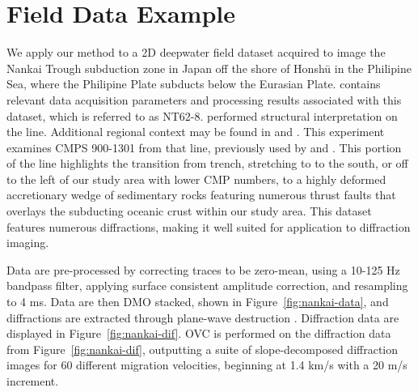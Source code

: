 
\section{Field Data Example}

We apply our method to a 2D deepwater field dataset acquired to image the Nankai Trough subduction zone in Japan off the shore of Honsh\=u in the Philipine Sea, where the Philipine Plate subducts below the Eurasian Plate.  \cite{moore1990structure} contains relevant data acquisition parameters and processing results associated with this dataset, which is referred to as NT62-8.  \cite{moore1993character} performed structural interpretation on the line. Additional regional context may be found in \cite{moore-2007} and \cite{bangs-2009}.  This experiment examines CMPS 900-1301 from that line, previously used by \cite{forel2005seismic} and \cite{deckerovc}. This portion of the line highlights the transition from trench, stretching to to the south, or off to the left of our study area with lower CMP numbers, to a highly deformed accretionary wedge of sedimentary rocks featuring numerous thrust faults that overlays the subducting oceanic crust within our study area.  This dataset features numerous diffractions, making it well suited for application to diffraction imaging.




Data are pre-processed by correcting traces to be zero-mean, using a 10-125 Hz bandpass filter, applying surface consistent amplitude correction, and resampling to 4 ms. Data are then DMO stacked, shown in Figure~\ref{fig:nankai-data}, and diffractions are extracted through plane-wave destruction \cite[]{fomel2}.  Diffraction data are displayed in Figure~\ref{fig:nankai-dif}.  
OVC is performed on the diffraction data from Figure~\ref{fig:nankai-dif}, outputting a suite of slope-decomposed diffraction images for 60 different migration velocities, beginning at 1.4 km/s with a 20 m/s increment.  

